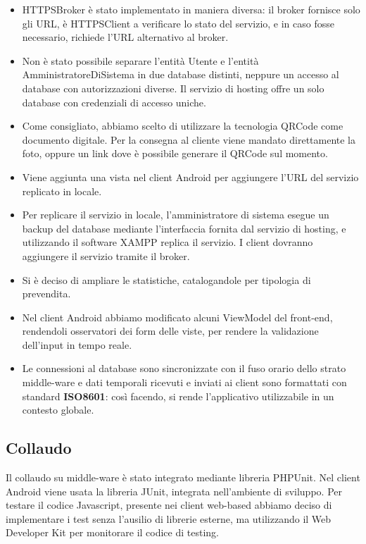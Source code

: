 \documentclass[a4paper]{article}
\begin{document}
\begin{itemize}
    \item HTTPSBroker è stato implementato in maniera diversa: il broker fornisce solo gli URL, è HTTPSClient a verificare lo stato del servizio, e in caso fosse necessario, richiede l'URL alternativo al broker.
    \item Non è stato possibile separare l'entità Utente e l'entità AmministratoreDiSistema in due database distinti, neppure un accesso al database con autorizzazioni diverse. Il servizio di hosting offre un solo database con credenziali di accesso uniche.
    \item Come consigliato, abbiamo scelto di utilizzare la tecnologia QRCode come documento digitale. Per la consegna al cliente viene mandato direttamente la foto, oppure un link dove è possibile generare il QRCode sul momento.
    \item Viene aggiunta una vista nel client Android per aggiungere l'URL del servizio replicato in locale.
    \item Per replicare il servizio in locale, l'amministratore di sistema esegue un backup del database mediante l'interfaccia fornita dal servizio di hosting, e utilizzando il software XAMPP replica il servizio. I client dovranno aggiungere il servizio tramite il broker.
    \item Si è deciso di ampliare le statistiche, catalogandole per tipologia di prevendita.
    \item Nel client Android abbiamo modificato alcuni ViewModel del front-end, rendendoli osservatori dei form delle viste, per rendere la validazione dell'input in tempo reale.
    \item Le connessioni al database sono sincronizzate con il fuso orario dello strato middle-ware e dati temporali ricevuti e inviati ai client sono formattati con standard \textbf{ISO8601}: così facendo, si rende l'applicativo utilizzabile in un contesto globale.
\end{itemize}

\subsection{Collaudo}

Il collaudo su middle-ware è stato integrato mediante libreria PHPUnit. Nel client Android viene usata la libreria JUnit, integrata nell'ambiente di sviluppo. Per testare il codice Javascript, presente nei client web-based abbiamo deciso di implementare i test senza l'ausilio di librerie esterne, ma utilizzando il Web Developer Kit per monitorare il codice di testing.
\end{document}
